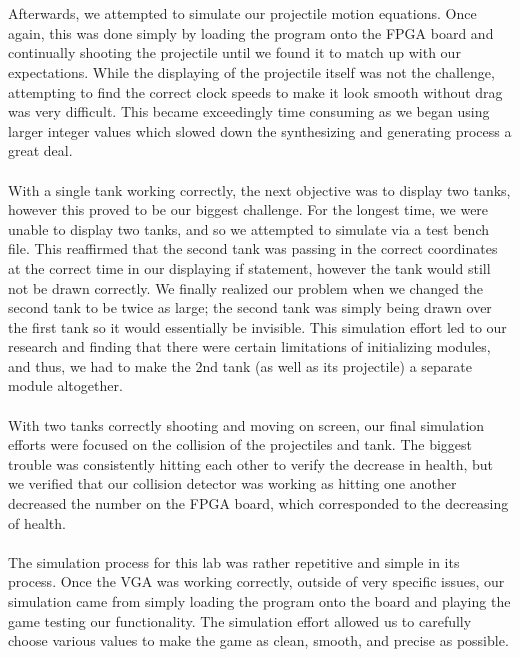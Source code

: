 \documentclass{article}
\begin{document}
\\
\\
Afterwards, we attempted to simulate our projectile motion equations.  Once again, this was done simply by loading the program onto the FPGA board and continually shooting the projectile until we found it to match up with our expectations.  While the displaying of the projectile itself was not the challenge, attempting to find the correct clock speeds to make it look smooth without drag was very difficult.  This became exceedingly time consuming as we began using larger integer values which slowed down the synthesizing and generating process a great deal. 
\\
\\
With a single tank working correctly, the next objective was to display two tanks, however this proved to be our biggest challenge.  For the longest time, we were unable to display two tanks, and so we attempted to simulate via a test bench file.  This reaffirmed that the second tank was passing in the correct coordinates at the correct time in our displaying if statement, however the tank would still not be drawn correctly.  We finally realized our problem when we changed the second tank to be twice as large; the second tank was simply being drawn over the first tank so it would essentially be invisible.  This simulation effort led to our research and finding that there were certain limitations of initializing modules, and thus, we had to make the 2nd tank (as well as its projectile) a separate module altogether.            
\\
\\
With two tanks correctly shooting and moving on screen, our final simulation efforts were focused on the collision of the projectiles and tank.  The biggest trouble was consistently hitting each other to verify the decrease in health, but we verified that our collision detector was working as hitting one another decreased the number on the FPGA board, which corresponded to the decreasing of health. 
\\
\\
The simulation process for this lab was rather repetitive and simple in its process.  Once the VGA was working correctly, outside of very specific issues, our simulation came from simply loading the program onto the board and playing the game testing our functionality.  The simulation effort allowed us to carefully choose various values to make the game as clean, smooth, and precise as possible. 
\end{document}
